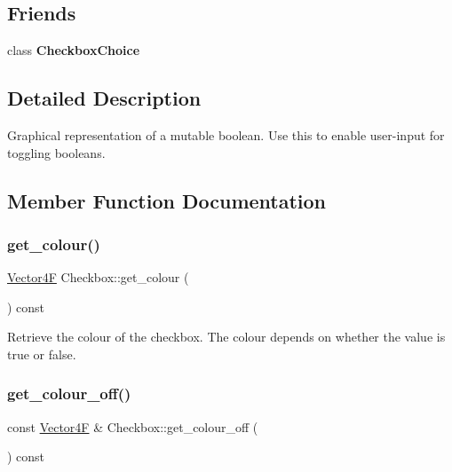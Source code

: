 \subsection*{Friends}
\begin{DoxyCompactItemize}
\item 
\mbox{\label{class_checkbox_a4b620fd2be6bc41e03130fc79d3ee6a3}} 
class {\bfseries Checkbox\+Choice}
\end{DoxyCompactItemize}


\subsection{Detailed Description}
Graphical representation of a mutable boolean. Use this to enable user-\/input for toggling booleans. 

\subsection{Member Function Documentation}
\mbox{\label{class_checkbox_ada05d14b0502bc3534c83478b7bad8fb}} 
\subsubsection{\texorpdfstring{get\+\_\+colour()}{get\_colour()}}
{\footnotesize\ttfamily \mbox{\hyperlink{class_vector4}{Vector4F}} Checkbox\+::get\+\_\+colour (\begin{DoxyParamCaption}{ }\end{DoxyParamCaption}) const}

Retrieve the colour of the checkbox. The colour depends on whether the value is true or false. \mbox{\label{class_checkbox_ac99d837db8754756bcaa417e96162844}} 
\subsubsection{\texorpdfstring{get\+\_\+colour\+\_\+off()}{get\_colour\_off()}}
{\footnotesize\ttfamily const \mbox{\hyperlink{class_vector4}{Vector4F}} \& Checkbox\+::get\+\_\+colour\+\_\+off (\begin{DoxyParamCaption}{ }\end{DoxyParamCaption}) const}

